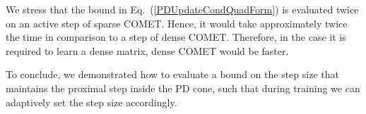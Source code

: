 \documentclass[twoside,11pt]{article}
\newcommand\mat[1]{{#1}}
\newcommand{\W}{\mat{W}}
\newcommand{\Hk}{H_k}
\newcommand{\Vk}{\mat{V_k}}
\renewcommand{\eqref}[1]{Eq.~(\ref{#1})}
\begin{document}


We stress that the bound in \eqref{PDUpdateCondQuadForm} is evaluated twice on an active step of sparse COMET. Hence, it would take approximately twice the time in comparison to a step of dense COMET. Therefore, in the case it is required to learn a dense matrix, dense COMET would be faster.

To conclude, we demonstrated how to evaluate a bound on the step size that maintains the proximal step inside the PD cone, such that during training we can adaptively set the step size accordingly.

\end{document}

